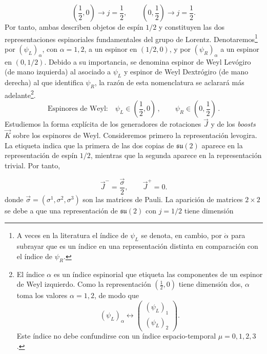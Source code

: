 \documentclass[a4paper,11pt]{book} %
\begin{document}
\begin{equation}
\left(\frac{1}{2},0\right)
\longrightarrow
j=\frac{1}{2},
\qquad
\left(0,\frac{1}{2}\right)
\longrightarrow
j=\frac{1}{2}.
\end{equation}
\noindent
Por tanto, ambas describen objetos de espín $1/2$ y constituyen las dos representaciones espinoriales fundamentales del grupo de Lorentz.
\medskip\newline
Denotaremos\footnote{A veces en la literatura el índice de $\psi_L$ se denota, en cambio,
por $\dot{\alpha}$ para subrayar que es un índice en una representación distinta
en comparación con el índice de $\psi_R$.} por $(\psi_L)_\alpha$, con
$\alpha = 1, 2$, a un espinor en $(1/2, 0)$, y por $(\psi_R)_\alpha$ a un espinor en
$(0, 1/2)$. Debido a su importancia, se denomina espinor de Weyl
Levógiro (de mano izquierda)  al asociado a  $\psi_L$ y espinor de Weyl
Dextrógiro (de mano derecha) al que identifica  $\psi_R$, la razón de esta nomenclatura se aclarará más adelante\footnote{El índice $\alpha$ es un índice espinorial que etiqueta las componentes de un espinor de Weyl izquierdo. Como la representación $\left(\frac{1}{2},0\right)$ tiene dimensión dos, $\alpha$ toma los valores $\alpha=1,2$, de modo que
\begin{equation}
(\psi_L)_\alpha
\longleftrightarrow
\begin{pmatrix}
(\psi_L)_1\\
(\psi_L)_2
\end{pmatrix}.
\end{equation}
Este índice no debe confundirse con un índice espacio-temporal $\mu=0,1,2,3$.}. 
\begin{equation}
\text{Espinores de Weyl:} \quad
\psi_L \in \left( \frac{1}{2}, 0 \right) \, , \qquad
\psi_R \in \left( 0, \frac{1}{2} \right) \, .
\end{equation}
\noindent
Estudiemos la forma explícita de los generadores de rotaciones $\vec J$ y de los \textit{boosts} $\vec K$ sobre los espinores de Weyl. Consideremos primero la representación levogira. La etiqueta indica que la primera de las dos copias de $\mathfrak{su}(2)$ aparece en la representación de espín $1/2$, mientras que la segunda aparece en la representación trivial. Por tanto,

\begin{equation}
\vec J^{-}
=
\frac{\vec{\sigma}}{2},
\qquad
\vec J^{+}
=
0.
\end{equation}
\noindent
donde $\vec \sigma=(\sigma^1,\sigma^2,\sigma^3)$ son las matrices de Pauli. La aparición de matrices $2\times2$ se debe a que una representación de $\mathfrak{su}(2)$ con $j=1/2$ tiene dimensión
\end{document}
